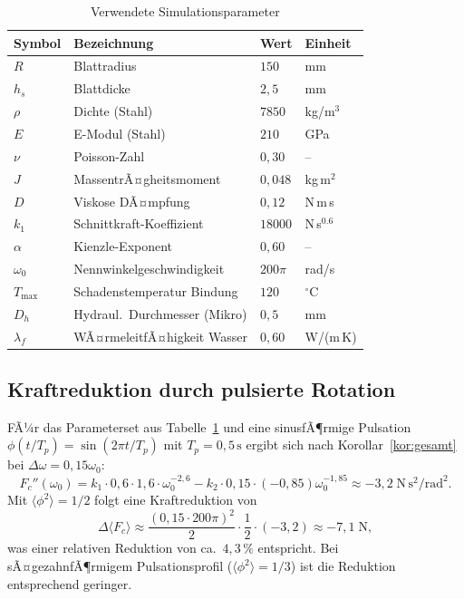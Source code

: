 ﻿\documentclass[a4paper,12pt]{article}
\theoremstyle{definition}
\begin{document}
\begin{table}[H]
\centering
\caption{Verwendete Simulationsparameter}
\label{tab:parameter}
\begin{tabular}{llll}
\toprule
\textbf{Symbol} & \textbf{Bezeichnung} & \textbf{Wert} & \textbf{Einheit} \\
\midrule
$R$        & Blattradius                   & $150$         & mm       \\
$h_s$      & Blattdicke                    & $2{,}5$       & mm       \\
$\rho$     & Dichte (Stahl)                & $7850$        & kg/m$^3$ \\
$E$        & E-Modul (Stahl)               & $210$         & GPa      \\
$\nu$      & Poisson-Zahl                  & $0{,}30$      & --       \\
$J$        & MassentrÃ¤gheitsmoment         & $0{,}048$     & kg\,m$^2$ \\
$D$        & Viskose DÃ¤mpfung              & $0{,}12$      & N\,m\,s  \\
$k_1$      & Schnittkraft-Koeffizient      & $18000$       & N\,s$^{0.6}$ \\
$\alpha$   & Kienzle-Exponent              & $0{,}60$      & --       \\
$\omega_0$ & Nennwinkelgeschwindigkeit     & $200\pi$      & rad/s    \\
$T_{\max}$ & Schadenstemperatur Bindung    & $120$         & $^\circ$C \\
$D_h$      & Hydraul.\ Durchmesser (Mikro) & $0{,}5$       & mm       \\
$\lambda_f$& WÃ¤rmeleitfÃ¤higkeit Wasser     & $0{,}60$      & W/(m\,K) \\
\bottomrule
\end{tabular}
\end{table}

\subsection{Kraftreduktion durch pulsierte Rotation}

FÃ¼r das Parameterset aus Tabelle~\ref{tab:parameter} und eine sinusfÃ¶rmige Pulsation
$\phi(t/T_p) = \sin(2\pi t/T_p)$ mit $T_p = 0{,}5\,\mathrm{s}$ ergibt sich nach
Korollar~\ref{kor:gesamt} bei $\Delta\omega = 0{,}15\omega_0$:
\[
F_c''(\omega_0) = k_1\cdot 0{,}6\cdot 1{,}6 \cdot \omega_0^{-2{,}6} - k_2\cdot 0{,}15\cdot(-0{,}85)\omega_0^{-1{,}85} \approx -3{,}2\;\mathrm{N\,s^2/rad^2}.
\]
Mit $\langle\phi^2\rangle = 1/2$ folgt eine Kraftreduktion von
\[
\Delta\langle F_c \rangle \approx \frac{(0{,}15\cdot 200\pi)^2}{2}\cdot\frac{1}{2}\cdot(-3{,}2) \approx -7{,}1\;\mathrm{N},
\]
was einer relativen Reduktion von ca.\ $4{,}3\,\%$ entspricht. Bei sÃ¤gezahnfÃ¶rmigem
Pulsationsprofil ($\langle\phi^2\rangle = 1/3$) ist die Reduktion entsprechend geringer.
\end{document}
